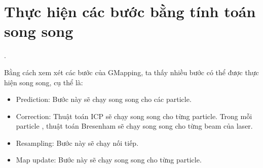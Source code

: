 \documentclass[../../main.tex]{subfiles}
\begin{document}
\section{Thực hiện các bước bằng tính toán song song}.

Bằng cách xem xét các bước của GMapping, ta thấy nhiều bước có thể  được thực hiện song song, cụ thể là:
\begin{itemize}
    \item Prediction: Bước này sẽ chạy song song cho các particle.
    \item Correction: Thuật toán ICP sẽ chạy song song cho từng particle. Trong mỗi particle , thuật toán Bresenham sẽ chạy song song cho từng beam của laser.
    \item Resampling: Bước này sẽ chạy nối tiếp.
    \item Map update: Bước này sẽ chạy song song cho từng particle.
\end{itemize}
\end{document}
